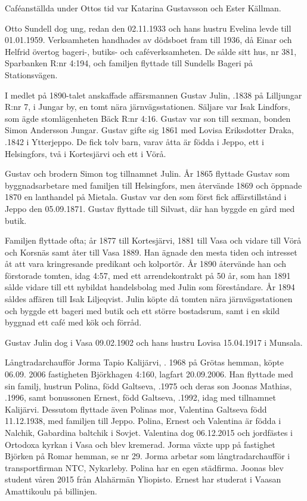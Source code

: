 Caféanställda under Ottos tid var Katarina Gustavsson och Ester Källman.

Otto Sundell dog ung, redan den 02.11.1933 och hans hustru Evelina levde till 01.01.1959. Verksamheten handhades av dödsboet fram till 1936, då Einar och	Helfrid övertog bageri-, butiks- och caféverksamheten. De sålde sitt hus, nr 381, Sparbanken R:nr 4:194, och familjen flyttade till Sundells Bageri på Stationsvägen.


I medlet på 1890-talet anskaffade affärsmannen Gustav Julin, .1838 på Lilljungar R:nr 7, i Jungar by, en tomt nära järnvägsstationen. Säljare var Isak Lindfors, som ägde stomlägenheten Bäck R:nr 4:16. Gustav var son till sexman, bonden Simon Andersson Jungar. Gustav gifte sig 1861 med Lovisa Eriksdotter Draka, .1842 i Ytterjeppo. De fick tolv barn, varav åtta är födda i Jeppo, ett i Helsingfors, två i Kortesjärvi och ett i Vörå.

Gustav och brodern Simon tog tillnamnet Julin. År 1865 flyttade Gustav som byggnadsarbetare med familjen till Helsingfors, men återvände 1869 och öppnade 1870 en lanthandel på Mietala. Gustav var den som först fick affärstillstånd i Jeppo den 05.09.1871. Gustav flyttade till Silvast, där han byggde en gård med butik.

Familjen flyttade ofta; år 1877 till Kortesjärvi, 1881 till Vasa och vidare till Vörå och Korsnäs samt åter till Vasa 1889. Han ägnade den mesta tiden och intresset åt att vara kringresande predikant	och kolportör. År 1890 återvände han och förstorade tomten, idag 4:57,	med ett arrendekontrakt på 50 år, som han 1891 sålde vidare till ett nybildat handelsbolag med Julin som föreståndare. År 1894 såldes affären till Isak Liljeqvist. Julin köpte då tomten nära järnvägsstationen och byggde ett bageri med butik och ett större bostadsrum, samt i en skild byggnad ett café med kök och förråd.

Gustav Julin dog i Vasa 09.02.1902 och hans hustru Lovisa 15.04.1917 i Munsala.




Långtradarchaufför Jorma Tapio Kalijärvi, . 1968 på Grötas hemman, köpte 06.09. 2006 fastigheten Björkhagen 4:160, lagfart 20.09.2006. Han flyttade med sin familj, hustrun Polina, född Galtseva, .1975 och deras son Joonas Mathias, .1996, samt bonussonen Ernest, född Galtseva, .1992, idag med tillnamnet Kalijärvi. Dessutom flyttade även Polinas mor, Valentina Galtseva  född 11.12.1938, med familjen till Jeppo. Polina, Ernest och Valentina är födda i Nalchik, Gabardina baltchik i Sovjet. Valentina dog 06.12.2015 och jordfästes i Ortodoxa kyrkan i Vasa och blev kremerad.
Jorma växte upp på fastighet Björken på Romar hemman, se nr 29. Jorma arbetar som långtradarchaufför i transportfirman NTC, Nykarleby. Polina har en egen städfirma. Joonas blev student våren 2015 från Alahärmän Yliopisto. Ernest har studerat i Vaasan Amattikoulu på billinjen.

